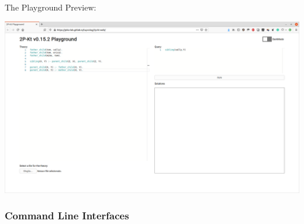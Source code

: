 \documentclass[handout]{beamer}
\begin{document}
\begin{frame}[allowframebreaks]{The Playground}
    Preview:
    \begin{center}
        \includegraphics[width=.9\linewidth]{img/playground.png}
    \end{center}
\end{frame}


\subsubsection{Command Line Interfaces}
\end{document}
